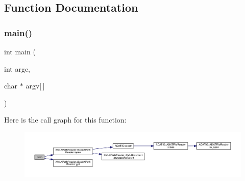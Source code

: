 \subsection{Function Documentation}
\mbox{\label{adat-devel_2other__libs_2xpath__reader_2examples_2xpath__reader__bool__test_8cc_a0ddf1224851353fc92bfbff6f499fa97}} 
\subsubsection{\texorpdfstring{main()}{main()}}
{\footnotesize\ttfamily int main (\begin{DoxyParamCaption}\item[{int}]{argc,  }\item[{char $\ast$}]{argv\mbox{[}$\,$\mbox{]} }\end{DoxyParamCaption})}

Here is the call graph for this function\+:
\nopagebreak
\begin{figure}[H]
\begin{center}
\leavevmode
\includegraphics[width=350pt]{df/d50/adat-devel_2other__libs_2xpath__reader_2examples_2xpath__reader__bool__test_8cc_a0ddf1224851353fc92bfbff6f499fa97_cgraph}
\end{center}
\end{figure}
